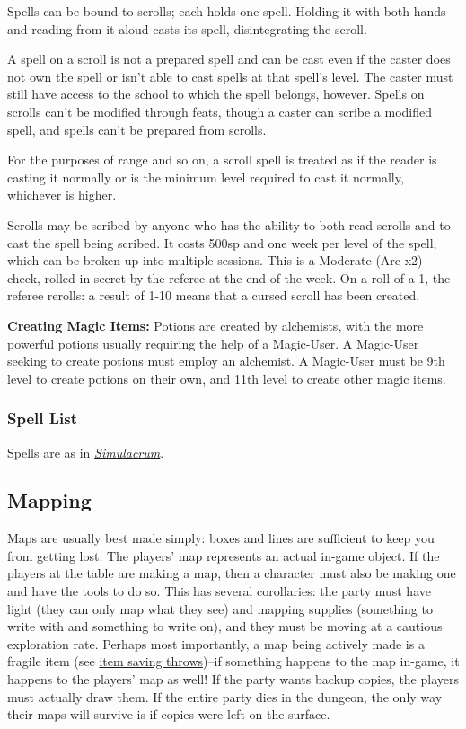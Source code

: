 \documentclass{article}
\begin{document}
\begin{multicols}{2}
Spells can be bound to scrolls; each holds one spell. Holding it with
both hands and reading from it aloud casts its spell, disintegrating the
scroll.

A spell on a scroll is not a prepared spell and can be cast even if the
caster does not own the spell or isn't able to cast spells at that
spell's level. The caster must still have access to the school to which
the spell belongs, however. Spells on scrolls can't be modified through
feats, though a caster can scribe a modified spell, and spells can't be
prepared from scrolls.

For the purposes of range and so on, a scroll spell is treated as if the
reader is casting it normally or is the minimum level required to cast
it normally, whichever is higher.

Scrolls may be scribed by anyone who has the ability to both read
scrolls and to cast the spell being scribed. It costs 500sp and one week
per level of the spell, which can be broken up into multiple sessions.
This is a Moderate (Arc x2) check, rolled in secret by the referee at
the end of the week. On a roll of a 1, the referee rerolls: a result of
1-10 means that a cursed scroll has been created.

\textbf{Creating Magic Items:} Potions are created by alchemists, with
the more powerful potions usually requiring the help of a Magic-User. A
Magic-User seeking to create potions must employ an alchemist. A
Magic-User must be 9th level to create potions on their own, and 11th
level to create other magic items.

\subsubsection{Spell List}\label{spell-list}

Spells are as in
\href{https://osrsimulacrum.blogspot.com/2021/06/simulacrum-beta-release.html}{\emph{Simulacrum}}.

\subsection{Mapping}\label{mapping}

Maps are usually best made simply: boxes and lines are sufficient to
keep you from getting lost. The players' map represents an actual
in-game object. If the players at the table are making a map, then a
character must also be making one and have the tools to do so. This has
several corollaries: the party must have light (they can only map what
they see) and mapping supplies (something to write with and something to
write on), and they must be moving at a cautious exploration rate.
Perhaps most importantly, a map being actively made is a fragile item
(see \hyperref[item-saving-throws]{item saving throws})--if something
happens to the map in-game, it happens to the players' map as well! If
the party wants backup copies, the players must actually draw them. If
the entire party dies in the dungeon, the only way their maps will
survive is if copies were left on the surface.


\end{multicols}
\end{document}
